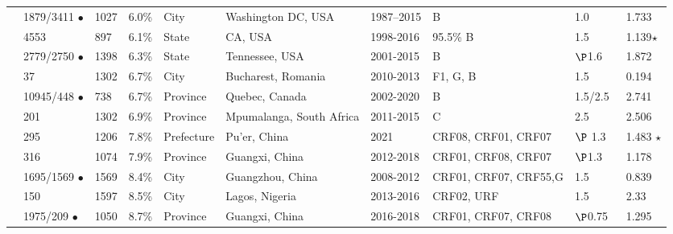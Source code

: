 \documentclass[utf8]{FrontiersinHarvard} %
\begin{document}
\begin{table}[h!]
\begin{ssmall}
\begin{tabular}{llllllllll}
			\cite{Perez-Losada:2017aa}  & 1879/3411 $\bullet$ & 1027 & 6.0\%  & City       & Washington DC, USA       & 1987–2015 & B                     & 1.0                                        & 1.733          \\
			\cite{rhee_national_2019}   & 4553                & 897  & 6.1\%  & State      & CA, USA                  & 1998-2016 & 95.5\% B              & 1.5                                        & 1.139$\star$   \\
			\cite{chato_public_2020}    & 2779/2750 $\bullet$ & 1398 & 6.3\%  & State      & Tennessee, USA           & 2001-2015 & B                     & $\P$1.6                                    & 1.872          \\
			\cite{Temereanca:2017aa}    & 37                  & 1302 & 6.7\%  & City       & Bucharest, Romania       & 2010-2013 & F1, G, B              & 1.5                                        & 0.194          \\
			\cite{brenner_role_2021}    & 10945/448 $\bullet$ & 738  & 6.7\%  & Province   & Quebec, Canada           & 2002-2020 & B                     & 1.5/2.5\                                   & 2.741          \\
			\citet{sivay_hiv-1_2018}    & 201                 & 1302 & 6.9\%  & Province   & Mpumalanga, South Africa & 2011-2015 & C                     & 2.5                                        & 2.506          \\
			\cite{Li:2022aa}            & 295                 & 1206 & 7.8\%  & Prefecture & Pu'er, China             & 2021      & CRF08, CRF01, CRF07   & $\P$ 1.3                                   & 1.483  $\star$ \\
			\cite{Yu:2022aa}            & 316                 & 1074 & 7.9\%  & Province   & Guangxi, China           & 2012-2018 & CRF01, CRF08, CRF07   & $\P$1.3                                    & 1.178          \\
			\cite{Yan:2021aa}           & 1695/1569 $\bullet$ & 1569 & 8.4\%  & City       & Guangzhou, China         & 2008-2012 & CRF01, CRF07, CRF55,G & 1.5                                        & 0.839          \\
			\cite{Billings:2019aa}      & 150                 & 1597 & 8.5\%  & City       & Lagos, Nigeria           & 2013-2016 & CRF02, URF            & 1.5                                        & 2.33           \\
			\cite{Chen:2023aa}          & 1975/209  $\bullet$ & 1050 & 8.7\%  & Province   & Guangxi, China           & 2016-2018 & CRF01, CRF07, CRF08   & $\P$0.75                                   & 1.295          \\

\end{tabular}
\end{ssmall}
\end{table}
\end{document}
